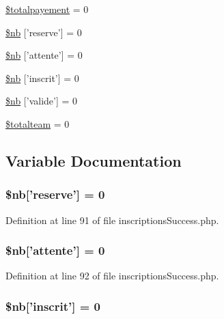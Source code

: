 \begin{DoxyCompactItemize}
\item 
\hyperlink{inscriptions_success_8php_ae8dd4df19926f1f64c490ce1bbd42c25}{\$totalpayement} = 0
\item 
\hyperlink{inscriptions_success_8php_a51dd184ddac2cc4fb4915b0bf654c4ab}{\$nb} \mbox{[}'reserve'\mbox{]} = 0
\item 
\hyperlink{inscriptions_success_8php_a1bcf7e20cae5e89063a5294938f0397a}{\$nb} \mbox{[}'attente'\mbox{]} = 0
\item 
\hyperlink{inscriptions_success_8php_a53068f4aef95390f2674414735f8e5ed}{\$nb} \mbox{[}'inscrit'\mbox{]} = 0
\item 
\hyperlink{inscriptions_success_8php_ae49886c566173f76a8f27f715e4562fd}{\$nb} \mbox{[}'valide'\mbox{]} = 0
\item 
\hyperlink{inscriptions_success_8php_a7902d032669bb026f1c70ef34737fe9a}{\$totalteam} = 0
\end{DoxyCompactItemize}


\subsection{Variable Documentation}
\hypertarget{inscriptions_success_8php_a51dd184ddac2cc4fb4915b0bf654c4ab}{
\subsubsection[{\$nb}]{\setlength{\rightskip}{0pt plus 5cm}\$nb\mbox{[}'reserve'\mbox{]} = 0}}\label{inscriptions_success_8php_a51dd184ddac2cc4fb4915b0bf654c4ab}


Definition at line 91 of file inscriptions\-Success.\-php.

\hypertarget{inscriptions_success_8php_a1bcf7e20cae5e89063a5294938f0397a}{
\subsubsection[{\$nb}]{\setlength{\rightskip}{0pt plus 5cm}\$nb\mbox{[}'attente'\mbox{]} = 0}}\label{inscriptions_success_8php_a1bcf7e20cae5e89063a5294938f0397a}


Definition at line 92 of file inscriptions\-Success.\-php.

\hypertarget{inscriptions_success_8php_a53068f4aef95390f2674414735f8e5ed}{
\subsubsection[{\$nb}]{\setlength{\rightskip}{0pt plus 5cm}\$nb\mbox{[}'inscrit'\mbox{]} = 0}}\label{inscriptions_success_8php_a53068f4aef95390f2674414735f8e5ed}



